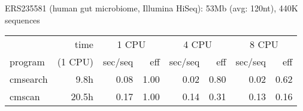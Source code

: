 \documentclass[landscape]{slides}
\begin{document}
\begin{slide}
\begin{center}
\medskip

\medskip

ERS235581 (human gut microbiome, Illumina HiSeq): 53Mb (avg: 120nt), 440K sequences

\begin{tabular}{l|r|rr|rr|rr}
         & time    & \multicolumn{2}{c}{1 CPU} & \multicolumn{2}{c}{4 CPU} & \multicolumn{2}{c}{8 CPU} \\ \cline{3-8}
program  & (1 CPU) & sec/seq & eff & sec/seq & eff & sec/seq & eff \\ \hline
cmsearch & 9.8h   & 0.08 & 1.00 & 0.02 & 0.80 & 0.02 & 0.62 \\
cmscan   & 20.5h  & 0.17 & 1.00 & 0.14 & 0.31 & 0.13 & 0.16 \\

\end{tabular}

%
\end{center}
\vfill
\end{slide}
\end{document}
